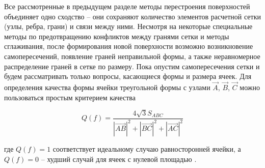 Все рассмотренные в предыдущем разделе методы перестроения поверхностей объединяет одно сходство -- они сохраняют количество элементов расчетной сетки (узлы, ребра, грани) и связи между ними.
Несмотря на некоторые специальные методы по предотвращению конфликтов между гранями сетки и методы сглаживания, после формирования новой поверхности возможно возникновение самопересечений, появление граней неправильной формы, а также неравномерное распределение граней в сетке по размеру.
Пока опустим самопересечения сетки и будем рассматривать только вопросы, касающиеся формы и размера ячеек.
Для определения качества формы ячейки треугольной формы с узлами $\vec{A}$, $\vec{B}$, $\vec{C}$ можно пользоваться простым критерием качества

\begin{equation}
Q(f) = \frac{4\sqrt{3} S_{ABC}}{|\vec{AB}|^2 + |\vec{BC}|^2 + |\vec{AC}|^2}
\end{equation}

где $Q(f) = 1$ соответствует идеальному случаю равносторонней ячейки, а $Q(f) = 0$ -- худший случай для ячеек с нулевой площадью \cite{Borouchaki}.

